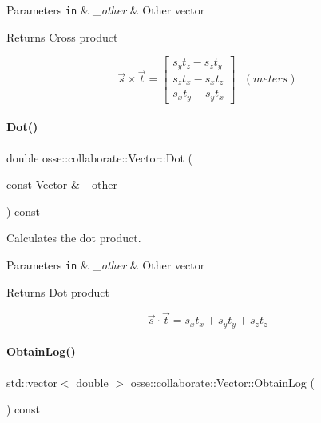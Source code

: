 \begin{DoxyParams}[1]{Parameters}
\mbox{\tt in}  & {\em \+\_\+other} & Other vector \\
\hline
\end{DoxyParams}
\begin{DoxyReturn}{Returns}
Cross product
\end{DoxyReturn}
\[ \vec{s} \times \vec{t} = \begin{bmatrix} s_y t_z - s_z t_y \\ s_z t_x - s_x t_z \\ s_x t_y - s_y t_x \end{bmatrix} ~~~(meters) \] \mbox{\label{classosse_1_1collaborate_1_1_vector_aa33392d41fcf146180125cc0b6a84efb}} 
\paragraph{\texorpdfstring{Dot()}{Dot()}}
{\footnotesize\ttfamily double osse\+::collaborate\+::\+Vector\+::\+Dot (\begin{DoxyParamCaption}\item[{const \hyperlink{classosse_1_1collaborate_1_1_vector}{Vector} \&}]{\+\_\+other }\end{DoxyParamCaption}) const}



Calculates the dot product. 


\begin{DoxyParams}[1]{Parameters}
\mbox{\tt in}  & {\em \+\_\+other} & Other vector \\
\hline
\end{DoxyParams}
\begin{DoxyReturn}{Returns}
Dot product
\end{DoxyReturn}
\[ \vec{s} \cdot \vec{t} = s_x t_x + s_y t_y + s_z t_z \] \mbox{\label{classosse_1_1collaborate_1_1_vector_acc6656dc258e0eab8cdd3baa0ac7a255}} 
\paragraph{\texorpdfstring{Obtain\+Log()}{ObtainLog()}}
{\footnotesize\ttfamily std\+::vector$<$ double $>$ osse\+::collaborate\+::\+Vector\+::\+Obtain\+Log (\begin{DoxyParamCaption}{ }\end{DoxyParamCaption}) const}



